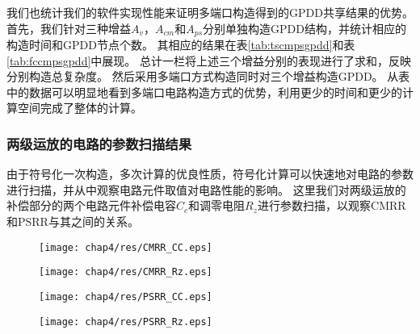 我们也统计我们的软件实现性能来证明多端口构造得到的GPDD共享结果的优势。
首先，我们针对三种增益$A_v$，$A_{cm}$和$A_{ps}$分别单独构造GPDD结构，并统计相应的构造时间和GPDD节点个数。
其相应的结果在表\ref{tab:tscmpsgpdd}和表\ref{tab:fccmpsgpdd}中展现。
总计一栏将上述三个增益分别的表现进行了求和，反映分别构造总复杂度。
然后采用多端口方式构造同时对三个增益构造GPDD。
从表中的数据可以明显地看到多端口电路构造方式的优势，利用更少的时间和更少的计算空间完成了整体的计算。

\subsubsection{两级运放的电路的参数扫描结果}

由于符号化一次构造，多次计算的优良性质，符号化计算可以快速地对电路的参数进行扫描，并从中观察电路元件取值对电路性能的影响。
这里我们对两级运放的补偿部分的两个电路元件补偿电容$C_c$和调零电阻$R_z$进行参数扫描，以观察CMRR和PSRR与其之间的关系。

\begin{figure}[!htp]
	\centering
	\texttt{[image: chap4/res/CMRR\_CC.eps]}
\end{figure}

\begin{figure}[!htp]
	\centering
	\texttt{[image: chap4/res/CMRR\_Rz.eps]}
\end{figure}

\begin{figure}[!htp]
	\centering
	\texttt{[image: chap4/res/PSRR\_CC.eps]}
\end{figure}

\begin{figure}[!htp]
	\centering
	\texttt{[image: chap4/res/PSRR\_Rz.eps]}
\end{figure}

